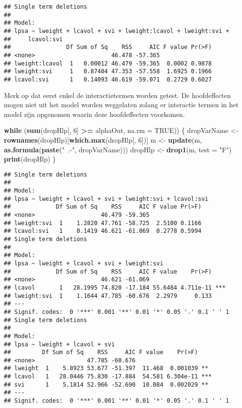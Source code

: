 \documentclass[12pt,dutch,coursenotes]{book}
\newenvironment{Shaded}{\begin{snugshade}}{\end{snugshade}}
\newcommand{\KeywordTok}[1]{\textcolor[rgb]{0.13,0.29,0.53}{\textbf{#1}}}
\newcommand{\DataTypeTok}[1]{\textcolor[rgb]{0.13,0.29,0.53}{#1}}
\newcommand{\DecValTok}[1]{\textcolor[rgb]{0.00,0.00,0.81}{#1}}
\newcommand{\StringTok}[1]{\textcolor[rgb]{0.31,0.60,0.02}{#1}}
\newcommand{\OtherTok}[1]{\textcolor[rgb]{0.56,0.35,0.01}{#1}}
\newcommand{\ControlFlowTok}[1]{\textcolor[rgb]{0.13,0.29,0.53}{\textbf{#1}}}
\newcommand{\OperatorTok}[1]{\textcolor[rgb]{0.81,0.36,0.00}{\textbf{#1}}}
\newcommand{\NormalTok}[1]{#1}
\theoremstyle{definition}
\theoremstyle{definition}
\theoremstyle{definition}
\theoremstyle{remark}
\begin{document}
\begin{verbatim}
## Single term deletions
## 
## Model:
## lpsa ~ lweight + lcavol + svi + lweight:lcavol + lweight:svi + 
##     lcavol:svi
##                Df Sum of Sq    RSS     AIC F value Pr(>F)
## <none>                      46.478 -57.365               
## lweight:lcavol  1   0.00012 46.479 -59.365  0.0002 0.9878
## lweight:svi     1   0.87404 47.353 -57.558  1.6925 0.1966
## lcavol:svi      1   0.14093 46.619 -59.071  0.2729 0.6027
\end{verbatim}

Merk op dat eerst enkel de interactietermen worden getest. De
hoofdeffecten mogen niet uit het model worden weggelaten zolang er
interactie termen in het model zijn opgenomen waarin deze hoofdeffecten
voorkomen.

\begin{Shaded}
\begin{Highlighting}[]
\ControlFlowTok{while}\NormalTok{ (}\KeywordTok{sum}\NormalTok{(dropHlp[, }\DecValTok{6}\NormalTok{] }\OperatorTok{>=}\StringTok{ }\NormalTok{alphaOut, }\DataTypeTok{na.rm =} \OtherTok{TRUE}\NormalTok{)) \{}
\NormalTok{    dropVarName <-}\StringTok{ }\KeywordTok{rownames}\NormalTok{(dropHlp)[}\KeywordTok{which.max}\NormalTok{(dropHlp[, }
        \DecValTok{6}\NormalTok{])]}
\NormalTok{    m <-}\StringTok{ }\KeywordTok{update}\NormalTok{(m, }\KeywordTok{as.formula}\NormalTok{(}\KeywordTok{paste}\NormalTok{(}\StringTok{"~.-"}\NormalTok{, dropVarName)))}
\NormalTok{    dropHlp <-}\StringTok{ }\KeywordTok{drop1}\NormalTok{(m, }\DataTypeTok{test =} \StringTok{"F"}\NormalTok{)}
    \KeywordTok{print}\NormalTok{(dropHlp)}
\NormalTok{\}}
\end{Highlighting}
\end{Shaded}

\begin{verbatim}
## Single term deletions
## 
## Model:
## lpsa ~ lweight + lcavol + svi + lweight:svi + lcavol:svi
##             Df Sum of Sq    RSS     AIC F value Pr(>F)
## <none>                   46.479 -59.365               
## lweight:svi  1    1.2820 47.761 -58.725  2.5100 0.1166
## lcavol:svi   1    0.1419 46.621 -61.069  0.2778 0.5994
## Single term deletions
## 
## Model:
## lpsa ~ lweight + lcavol + svi + lweight:svi
##             Df Sum of Sq    RSS     AIC F value    Pr(>F)    
## <none>                   46.621 -61.069                      
## lcavol       1   28.1995 74.820 -17.184 55.6484 4.711e-11 ***
## lweight:svi  1    1.1644 47.785 -60.676  2.2979     0.133    
## ---
## Signif. codes:  0 '***' 0.001 '**' 0.01 '*' 0.05 '.' 0.1 ' ' 1
## Single term deletions
## 
## Model:
## lpsa ~ lweight + lcavol + svi
##         Df Sum of Sq    RSS     AIC F value    Pr(>F)    
## <none>               47.785 -60.676                      
## lweight  1    5.8923 53.677 -51.397  11.468  0.001039 ** 
## lcavol   1   28.0446 75.830 -17.884  54.581 6.304e-11 ***
## svi      1    5.1814 52.966 -52.690  10.084  0.002029 ** 
## ---
## Signif. codes:  0 '***' 0.001 '**' 0.01 '*' 0.05 '.' 0.1 ' ' 1
\end{verbatim}
\end{document}
